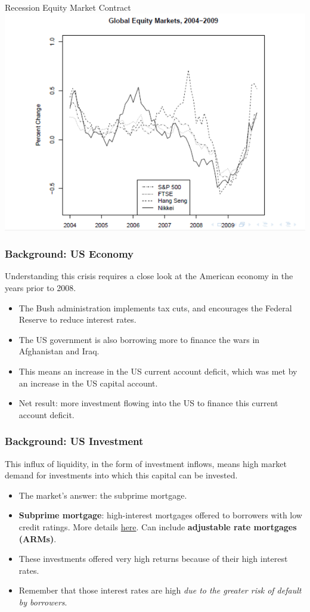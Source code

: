 \documentclass{beamer}
\begin{document}
\begin{frame}{\LARGE Recession Equity Market Contract}
	\centering
	\includegraphics[width=\textwidth,height=.8\textheight,keepaspectratio]{globalequity.png}
\end{frame}

\begin{frame} 
	\frametitle{\LARGE{Background: US Economy}}
	Understanding this crisis requires a close look at the American economy in the years prior to 2008. \pause
	\begin{itemize}
		\item The Bush administration implements tax cuts, and encourages the Federal Reserve to reduce interest rates. \pause
		\item The US government is also borrowing more to finance the wars in Afghanistan and  Iraq. \pause	
		\item This means an increase in the US current account deficit, which was met by an increase in the US capital account. \pause
		\item Net result: more investment flowing into the US to finance this current account deficit.
	\end{itemize}
\end{frame}

\begin{frame} 
	\frametitle{\LARGE{Background: US Investment}}
	This influx of liquidity, in the form of investment inflows, means high market demand for investments into which this capital can be invested. \pause
	\begin{itemize}
		\item The market's answer: the subprime mortgage. \pause
		\item \textbf{Subprime mortgage}: high-interest mortgages offered to borrowers with low credit ratings. More details \href{https://www.investopedia.com/terms/s/subprime_mortgage.asp}{here}. Can include \textbf{adjustable rate mortgages (ARMs)}. \pause	
		\item These investments offered very high returns because of their high interest rates. \pause
		\item Remember that those interest rates are high \textit{due to the greater risk of default by borrowers}.
	\end{itemize}
\end{frame}
\end{document}
